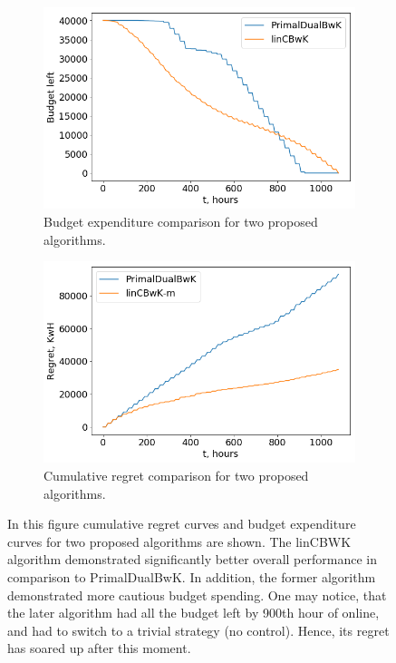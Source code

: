 \begin{figure}
\centering
\begin{subfigure}{.8\textwidth}
    \label{fig:budget}
    \centering
    \includegraphics[width=1\textwidth]{figures/budget}
    \caption{Budget expenditure comparison for two proposed algorithms.}
\end{subfigure}
\begin{subfigure}{.8\textwidth}
    \label{fig:regret}
    \centering
    \includegraphics[width=1\textwidth]{figures/regret}
    \caption{Cumulative regret comparison for two proposed algorithms.}
\end{subfigure}
\caption{In this figure cumulative regret curves and budget expenditure curves for two proposed algorithms are shown. The linCBWK algorithm demonstrated significantly better overall performance in comparison to PrimalDualBwK. In addition, the former algorithm demonstrated more cautious budget spending. One may notice, that the later algorithm had all the budget left by 900th hour of online, and had to switch to a trivial strategy (no control). Hence, its regret has soared up after this moment.}
\label{fig:budget_and_regret}
\end{figure}

    